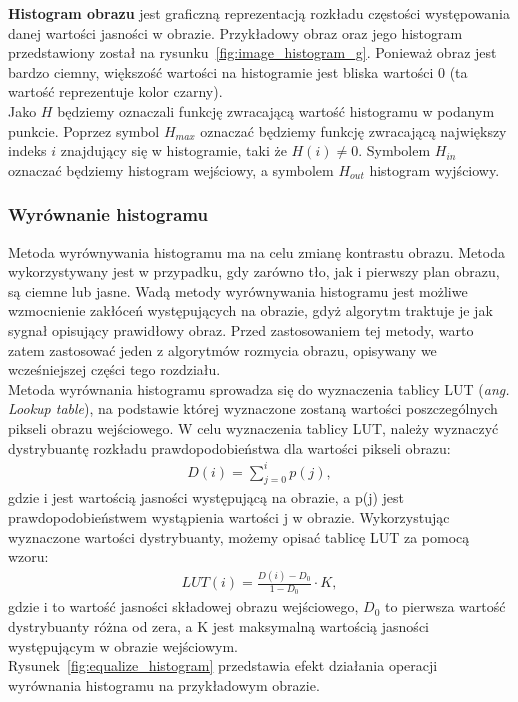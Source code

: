 \textbf{Histogram obrazu} jest graficzną reprezentacją rozkładu częstości występowania danej wartości jasności w obrazie. Przykładowy obraz oraz jego histogram przedstawiony został na rysunku~\ref{fig:image_histogram_g}. Ponieważ obraz jest bardzo ciemny, większość wartości na histogramie jest bliska wartości 0 (ta wartość reprezentuje kolor czarny).\\
Jako $H$ będziemy oznaczali funkcję zwracającą wartość histogramu w podanym punkcie. Poprzez symbol $H_{max}$ oznaczać będziemy funkcję zwracającą największy indeks $i$ znajdujący się w histogramie, taki że $H(i) \neq 0$. Symbolem $H_{in}$ oznaczać będziemy histogram wejściowy, a symbolem $H_{out}$ histogram wyjściowy.\\

\subsubsection{Wyrównanie histogramu}
Metoda wyrównywania histogramu ma na celu zmianę kontrastu obrazu. Metoda wykorzystywany jest w przypadku, gdy zarówno tło, jak i pierwszy plan obrazu, są ciemne lub jasne. Wadą metody wyrównywania histogramu jest możliwe wzmocnienie zakłóceń występujących na obrazie, gdyż algorytm traktuje je jak sygnał opisujący prawidłowy obraz. Przed zastosowaniem tej metody, warto zatem zastosować jeden z algorytmów rozmycia obrazu, opisywany we wcześniejszej części tego rozdziału.\\
Metoda wyrównania histogramu sprowadza się do wyznaczenia tablicy LUT (\textit{ang. Lookup table}), na podstawie której wyznaczone zostaną wartości poszczególnych pikseli obrazu wejściowego. W celu wyznaczenia tablicy LUT, należy wyznaczyć dystrybuantę rozkładu prawdopodobieństwa dla wartości pikseli obrazu:
\begin{gather*}
  D(i) = \sum\limits_{j=0}^i p(j),
\end{gather*}
gdzie i jest wartością jasności występującą na obrazie, a p(j) jest prawdopodobieństwem wystąpienia wartości j w obrazie. Wykorzystując wyznaczone wartości dystrybuanty, możemy opisać tablicę LUT za pomocą wzoru:
\begin{gather*}
  LUT(i) = \frac{D(i)-D_0}{1-D_0} \cdot K,
\end{gather*}
gdzie i to wartość jasności składowej obrazu wejściowego, $D_0$ to pierwsza wartość dystrybuanty różna od zera, a K jest maksymalną wartością jasności występującym w obrazie wejściowym.\\
Rysunek~\ref{fig:equalize_histogram} przedstawia efekt działania operacji wyrównania histogramu na przykładowym obrazie.
